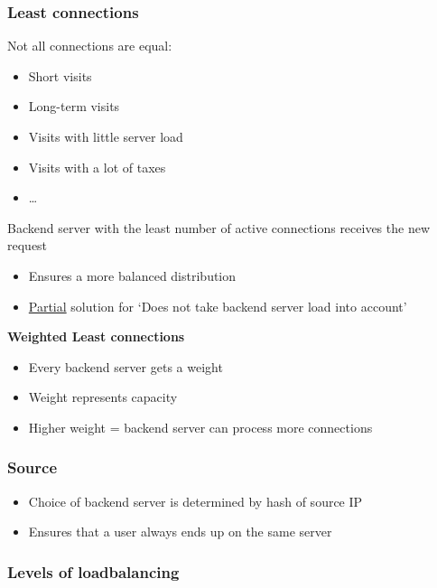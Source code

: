 \documentclass{article}
\begin{document}
\subsubsection{Least connections}

Not all connections are equal:

\begin{itemize}
    \item Short visits
    \item Long-term visits
    \item Visits with little server load
    \item Visits with a lot of taxes
    \item \dots
\end{itemize}

Backend server with the least number of active connections receives the new request

\begin{itemize}
    \item Ensures a more balanced distribution
    \item \underline{Partial} solution for `Does not take backend server load into account'
\end{itemize}

\textbf{Weighted Least connections}

\begin{itemize}
    \item Every backend server gets a weight
    \item Weight represents capacity
    \item Higher weight = backend server can process more connections
\end{itemize}

\subsubsection{Source}

\begin{itemize}
    \item Choice of backend server is determined by hash of source IP
    \item Ensures that a user always ends up on the same server
\end{itemize}

\subsubsection{Levels of loadbalancing}
\end{document}

